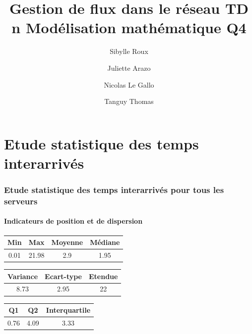 \documentclass{article}
\begin{document}
\title{Gestion de flux dans le réseau
	\smallbreak
	TD n
	\smallbreak
	Modélisation mathématique
	\smallbreak
	Q4}
\author{Sibylle Roux \and Juliette Arazo \and Nicolas Le Gallo \and Tanguy Thomas}


\maketitle

\newpage

\tableofcontents

\newpage

\part{Etude statistique des temps interarrivés}

\section{Etude statistique des temps interarrivés pour tous les serveurs}

\subsection{Indicateurs de position et de dispersion}

\begin{center}
\begin{tabular}{cccc}
\hline
\hline
Min & Max & Moyenne & Médiane \\
\hline
0.01 & 21.98 & 2.9 & 1.95 \\
\hline
\hline
\end{tabular}
\end{center}

\begin{center}
\begin{tabular}{ccc}
\hline
\hline
Variance & Ecart-type & Etendue \\
\hline
8.73 & 2.95 & 22 \\
\hline
\hline
\end{tabular}
\end{center}

\begin{center}
\begin{tabular}{ccc}
\hline
\hline
Q1 & Q2 & Interquartile \\
\hline
0.76 & 4.09 & 3.33 \\
\hline
\hline
\end{tabular}
\end{center}
\end{document}
